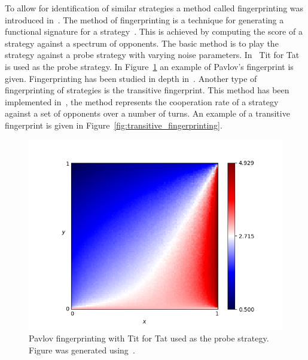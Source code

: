 \documentclass{article}
\theoremstyle{definition}
\begin{document}
To allow for identification of similar strategies a method called
fingerprinting was introduced in~\cite{Ashlock2005}. The method of fingerprinting is a
technique for generating a functional signature for a
strategy~\cite{Ashlock2008}. This is achieved by computing the score of a
strategy against a spectrum of opponents. The basic method is to play the
strategy against a probe strategy with varying noise parameters.
In~\cite{Ashlock2005} Tit for Tat is used as the probe strategy. In
Figure~\ref{fig:fingerprinting} an example of Pavlov's fingerprint is given.
Fingerprinting has been studied in depth in~\cite{Ashlock2008, Ashlock2009,
Ashlock2010, Ashlock2006a}. Another type of fingerprinting of strategies is the
transitive fingerprint. This method has been implemented in~\cite{axelrodproject},
the method represents the cooperation rate of a strategy against a set of opponents
over a number of turns. An example of a transitive fingerprint is given in
Figure~\ref{fig:transitive_fingerprinting}.

\begin{figure}[!hbtp]
    \centering
    \includegraphics[height=.3\textheight]{./assets/images/Win-Stay_Lose-Shift.png}
    \caption{Pavlov fingerprinting with Tit for Tat used as the probe strategy.
    Figure was generated using~\cite{axelrodproject}.}
    \label{fig:fingerprinting}
\end{figure}
\end{document}
